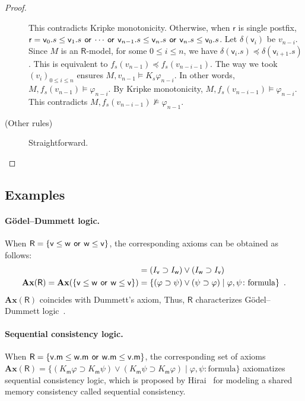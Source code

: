 \begin{proof}
\begin{description}
	   This contradicts Kripke monotonicity.
	   Otherwise, when $\mathsf r$ is single postfix,
	   $\mathsf r = \mathsf v_0.s\le\mathsf
	   v_1.s\,\mathbin{\mathsf{or}}\,\cdots\,\mathbin{\mathsf{or}}\,\mathsf v_{n-1}.s\le\mathsf
	   v_n.s\,\mathbin{\mathsf{or}}\,\mathsf v_n.s\le\mathsf v_0.s$.
	   Let $\delta(\mathsf v_i)$ be $v_{n-i}$.
	   Since $M$ is an $\mathsf R$-model,
	   for some $0\le i\le n$,
	   we have $\delta(\mathsf v_i.s)\preceq \delta(\mathsf
	   v_{i+1}.s)$.
	   This is equivalent to $f_s(v_{n-1})\preceq f_s(v_{n-i-1})$.
	   The way we took $(v_i)_{0\le i\le n}$ ensures
	   $M,v_{n-1}\models K_s\varphi_{n-i}$.
	   In other words, $M,f_s(v_{n-1})\models \varphi_{n-i}$.
	   By Kripke monotonicity, $M,f_s(v_{n-i-1})\models
	   \varphi_{n-i}$.
	   This contradicts $M,f_s(v_{n-i-1})\not\models\varphi_{n-1}$.
      \item[(Other rules)]
	   Straightforward.
     \end{description}
    \end{proof}

   \subsection{Examples}

    \paragraph{G\"{o}del--Dummett logic.}
    When $\mathsf R=\{\mathsf v\le\mathsf w\,\mathbin{\mathsf{or}}\,\mathsf w\le\mathsf v\}$,
    the corresponding axioms can be obtained as follows:
    \begin{align*}
     [\mathsf v\le \mathsf w\wor \mathsf w\le\mathsf v] &=
     (I_{\mathsf v}\supset I_{\mathsf w})\vee (I_{\mathsf w}\supset
     I_{\mathsf v})\\
     \mathbf{Ax}(\mathsf R) = \mathbf{Ax}(\{\mathsf v\le\mathsf w\wor \mathsf
     w\le \mathsf v\}) &= \{(\varphi\supset\psi)\vee(\psi\supset\varphi)\mid
     \varphi,\psi\colon\mbox{formula}\}\enspace.
    \end{align*}
    $\mathbf{Ax}(\mathsf R)$ coincides with Dummett's axiom,  Thus,
    $\mathsf R$ characterizes
    G\"{o}del--Dummett logic~\cite{dummett59}.

    \paragraph{Sequential consistency logic.}
    When $\mathsf R=\{\mathsf v.\mathsf m\le\mathsf w.\mathsf m\,\mathbin{\mathsf{or}}\, \mathsf
    w.\mathsf m\le \mathsf v.\mathsf m\}$,
    the corresponding set of axioms
    $\mathbf{Ax}(\mathsf R) = \{(K_{\mathsf m}\varphi\supset K_{\mathsf
    m}\psi)\vee(K_{\mathsf m}\psi\supset K_{\mathsf m}\varphi)\mid \varphi,
    \psi\colon\mbox{formula}\}$
    axiomatizes sequential consistency logic,
    which is proposed by Hirai~\cite{hirailpar} for modeling a shared memory consistency called sequential consistency.


